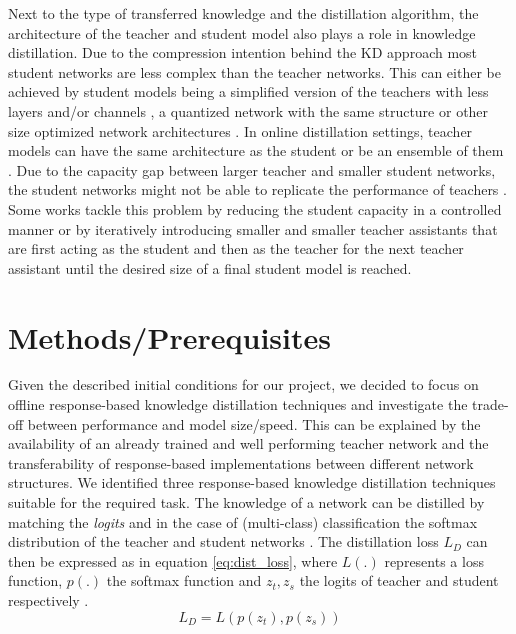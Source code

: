 \documentclass{article}
\begin{document}
Next to the type of transferred knowledge and the distillation algorithm, the architecture of the teacher and student model also plays a role in knowledge distillation.\newline 
Due to the compression intention behind the KD approach most student networks are less complex than the teacher networks. This can either be achieved by student models being a simplified version of the teachers with less layers and/or channels \cite{wangProgressiveBlockwiseKnowledge2018,liFewSampleKnowledge2020}, a quantized network with the same structure \cite{shinKnowledgeDistillationOptimization2019} or other size optimized network architectures \cite{howardMobileNetsEfficientConvolutional2017,guSearchBetterStudents2020a}. In online distillation settings, teacher models can have the same architecture as the student or be an ensemble of them \cite{zhangDeepMutualLearning2017}. Due to the capacity gap between larger teacher and smaller student networks, the student networks might not be able to replicate the performance of teachers \cite{mirzadehImprovedKnowledgeDistillation2019}. Some works tackle this problem by reducing the student capacity in a controlled manner \cite{guSearchBetterStudents2020a} or by iteratively introducing smaller and smaller teacher assistants that are first acting as the student and then as the teacher for the next teacher assistant until the desired size of a final student model is reached.


\section{Methods/Prerequisites}
Given the described initial conditions for our project, we decided to focus on offline response-based knowledge distillation techniques and investigate the trade-off between performance and model size/speed. This can be explained by the availability of an already trained and well performing teacher network and the transferability of response-based implementations between different network structures.
We identified three response-based knowledge distillation techniques suitable for the required task.
\newline
The knowledge of a network can be distilled by matching the \textit{logits} and in the case of (multi-class) classification the softmax distribution of the teacher and student networks \cite{hintonDistillingKnowledgeNeural2015}. The distillation loss $ L_D $ can then be expressed as in equation \ref{eq:dist_loss}, where $ L(.) $ represents a loss function, $ p(.) $ the softmax function and $ z_t, z_s $ the logits of teacher and student respectively \cite{gouKnowledgeDistillationSurvey2021}.
\begin{equation}
\label{eq:dist_loss}
L_D = L(p(z_t), p(z_s))
\end{equation}
\end{document}
